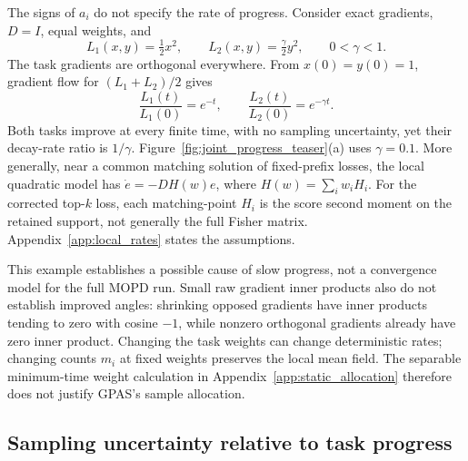 The signs of $a_i$ do not specify the rate of progress. Consider exact
gradients, $D=I$, equal weights, and
\begin{equation}
    L_1(x,y)=\tfrac12x^2,\qquad
    L_2(x,y)=\tfrac{\gamma}{2}y^2,\qquad 0<\gamma<1.
    \label{eq:zero_conflict_losses}
\end{equation}
The task gradients are orthogonal everywhere. From $x(0)=y(0)=1$,
gradient flow for $(L_1+L_2)/2$ gives
\begin{equation}
    \frac{L_1(t)}{L_1(0)}=e^{-t},\qquad
    \frac{L_2(t)}{L_2(0)}=e^{-\gamma t}.
    \label{eq:zero_conflict_rates}
\end{equation}
Both tasks improve at every finite time, with no sampling uncertainty,
yet their decay-rate ratio is $1/\gamma$.
Figure~\ref{fig:joint_progress_teaser}(a) uses $\gamma=0.1$.
More generally, near a common matching solution of fixed-prefix losses,
the local quadratic model has
$\dot e=-D H(w)e$, where $H(w)=\sum_iw_iH_i$.
For the corrected top-$k$ loss, each matching-point $H_i$ is the
score second moment on the retained support, not generally the full
Fisher matrix. Appendix~\ref{app:local_rates} states the assumptions.

This example establishes a possible cause of slow progress, not a
convergence model for the full MOPD run. Small raw gradient inner products
also do not establish improved angles: shrinking opposed gradients have
inner products tending to zero with cosine $-1$, while nonzero orthogonal
gradients already have zero inner product.
Changing the task weights can change deterministic rates; changing counts
$m_i$ at fixed weights preserves the local mean field. The separable
minimum-time weight calculation in Appendix~\ref{app:static_allocation}
therefore does not justify GPAS's sample allocation.

\subsection{Sampling uncertainty relative to task progress}

